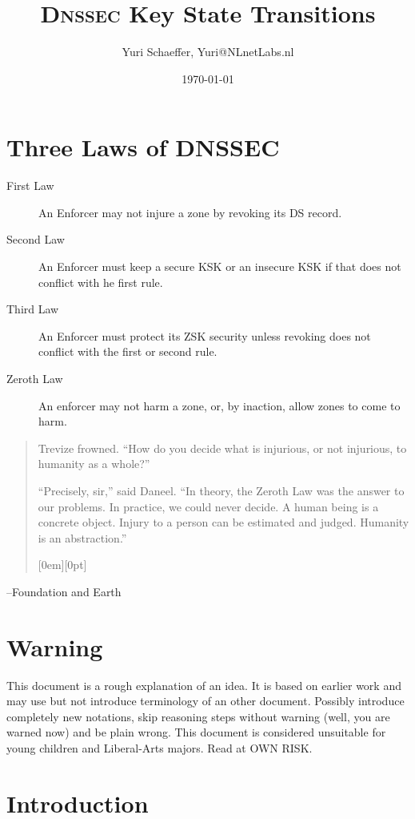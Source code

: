 \documentclass[twoside, a4paper]{article}
\title{\textsc{Dnssec} Key State Transitions}
\author{Yuri Schaeffer, Yuri@NLnetLabs.nl}
\date{\today}
\newenvironment{fancyquotation}{
   \begin{quotation}
	\noindent\llap{\raisebox{-2em}[2em][0pt]{\scalebox{5}{\color{quotemarkcolor}``}}}
}{
	\hfill\raisebox{-3em}[0em][0pt]{\scalebox{5}{\color{quotemarkcolor}''}}
   \end{quotation}
}
\begin{document}
\maketitle

\section{Three Laws of DNSSEC}
\begin{description}
\item[First Law] An Enforcer may not injure a zone by revoking its DS record.
\item[Second Law] An Enforcer must keep a secure KSK or an insecure KSK if that does not conflict with he first rule.
\item[Third Law] An Enforcer must protect its ZSK security unless revoking does not conflict with the first or second rule.
\item[Zeroth Law] An enforcer may not harm a zone, or, by inaction, allow zones to come to harm.
\end{description}

\begin{fancyquotation}
Trevize frowned. ``How do you decide what is injurious, or not injurious, to humanity as a whole?''

``Precisely, sir,'' said Daneel. ``In theory, the Zeroth Law was the answer to our problems. In practice, we could never decide. A human being is a concrete object. Injury to a person can be estimated and judged. Humanity is an abstraction.''
\end{fancyquotation}
\hfill--Foundation and Earth


\section{Warning}
This document is a rough explanation of an idea. It is based on earlier
work and may use but not introduce terminology of an other document. 
Possibly introduce completely new notations, skip reasoning steps without 
warning (well, you are warned now) and be plain wrong. This document is considered unsuitable
for young children and Liberal-Arts majors. Read at OWN RISK.

\pagebreak\tableofcontents

\section{Introduction}
\end{document}
